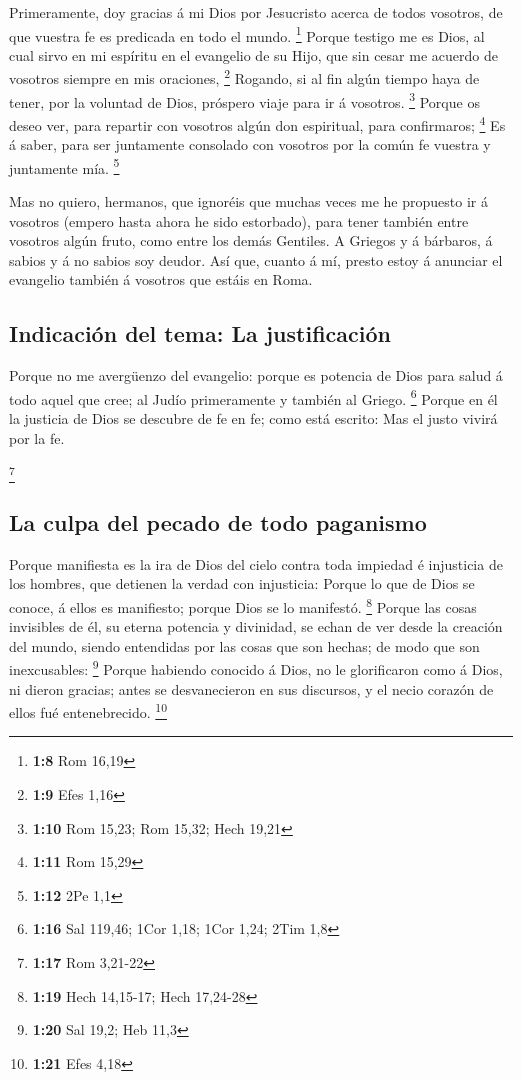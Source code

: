  Primeramente, doy gracias á mi Dios por Jesucristo acerca
de todos vosotros, de que vuestra fe es predicada en todo el mundo.
\footnote{\textbf{1:8} Rom 16,19}  Porque testigo me es
Dios, al cual sirvo en mi espíritu en el evangelio de su Hijo, que sin
cesar me acuerdo de vosotros siempre en mis oraciones, \footnote{\textbf{1:9}
  Efes 1,16}  Rogando, si al fin algún tiempo haya de
tener, por la voluntad de Dios, próspero viaje para ir á vosotros.
\footnote{\textbf{1:10} Rom 15,23; Rom 15,32; Hech 19,21} 
Porque os deseo ver, para repartir con vosotros algún don espiritual,
para confirmaros; \footnote{\textbf{1:11} Rom 15,29}  Es á
saber, para ser juntamente consolado con vosotros por la común fe
vuestra y juntamente mía. \footnote{\textbf{1:12} 2Pe 1,1}

 Mas no quiero, hermanos, que ignoréis que muchas veces me
he propuesto ir á vosotros (empero hasta ahora he sido estorbado), para
tener también entre vosotros algún fruto, como entre los demás Gentiles.
 A Griegos y á bárbaros, á sabios y á no sabios soy deudor.
 Así que, cuanto á mí, presto estoy á anunciar el evangelio
también á vosotros que estáis en Roma.

\hypertarget{indicaciuxf3n-del-tema-la-justificaciuxf3n}{%
\subsection{Indicación del tema: La
justificación}\label{indicaciuxf3n-del-tema-la-justificaciuxf3n}}

 Porque no me avergüenzo del evangelio: porque es potencia
de Dios para salud á todo aquel que cree; al Judío primeramente y
también al Griego. \footnote{\textbf{1:16} Sal 119,46; 1Cor 1,18; 1Cor
  1,24; 2Tim 1,8}  Porque en él la justicia de Dios se
descubre de fe en fe; como está escrito: Mas el justo vivirá por la fe.

\footnote{\textbf{1:17} Rom 3,21-22}

\hypertarget{la-culpa-del-pecado-de-todo-paganismo}{%
\subsection{La culpa del pecado de todo
paganismo}\label{la-culpa-del-pecado-de-todo-paganismo}}

 Porque manifiesta es la ira de Dios del cielo contra toda
impiedad é injusticia de los hombres, que detienen la verdad con
injusticia:  Porque lo que de Dios se conoce, á ellos es
manifiesto; porque Dios se lo manifestó. \footnote{\textbf{1:19} Hech
  14,15-17; Hech 17,24-28}  Porque las cosas invisibles de
él, su eterna potencia y divinidad, se echan de ver desde la creación
del mundo, siendo entendidas por las cosas que son hechas; de modo que
son inexcusables: \footnote{\textbf{1:20} Sal 19,2; Heb 11,3}
 Porque habiendo conocido á Dios, no le glorificaron como á
Dios, ni dieron gracias; antes se desvanecieron en sus discursos, y el
necio corazón de ellos fué entenebrecido. \footnote{\textbf{1:21} Efes
  4,18}

